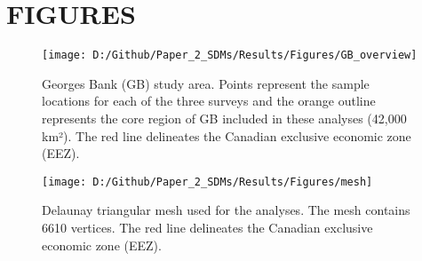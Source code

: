 \documentclass[
]{article}
\begin{document}
\hypertarget{ref-figs}{%
\section{FIGURES}\label{ref-figs}}

\begin{figure}
\texttt{[image: D:/Github/Paper\_2\_SDMs/Results/Figures/GB\_overview]} \caption{Georges Bank (GB) study area.  Points represent the sample locations for each of the three surveys and the orange outline represents the core region of GB included in these analyses (42,000 km²).  The red line delineates the Canadian exclusive economic zone (EEZ).}\label{fig:Overview}
\end{figure}

\clearpage
\begin{figure}
\texttt{[image: D:/Github/Paper\_2\_SDMs/Results/Figures/mesh]} \caption{Delaunay triangular mesh used for the analyses. The mesh contains 6610 vertices. The red line delineates the Canadian exclusive economic zone (EEZ).}\label{fig:Mesh}
\end{figure}
\end{document}
